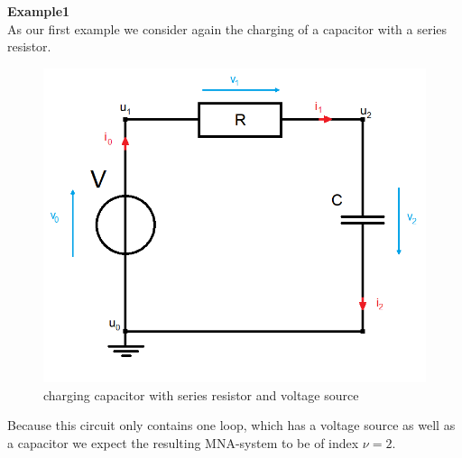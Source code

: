 \textbf{Example1} \label{ex:Index_Analysis} \\
	As our first example we consider again the charging of a capacitor with a series resistor.
	\begin{figure}[H]
		\centering
		\includegraphics[scale = 0.4]{pictures/Example1_simple_p2.png}
		\caption{charging capacitor with series resistor and voltage source}
	\end{figure}
	Because this circuit only contains one loop, which has a voltage source as well as a capacitor we expect the resulting MNA-system to be of index $\nu=2$. 
	
